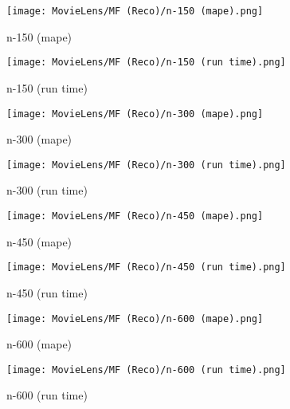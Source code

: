 \documentclass[12pt]{article}
\begin{document}
\begin{figure}[H]
\centering
    \begin{minipage}{0.45\textwidth}
        \centering
        \texttt{[image: MovieLens/MF (Reco)/n-150 (mape).png]}
        \caption{n-150 (mape)}
        
    \end{minipage}\hfill
    \begin{minipage}{0.45\textwidth}
        \centering
        \texttt{[image: MovieLens/MF (Reco)/n-150 (run time).png]}
        \caption{n-150 (run time)}
    \end{minipage}
\end{figure}

\begin{figure}[H]
\centering
    \begin{minipage}{0.45\textwidth}
        \centering
        \texttt{[image: MovieLens/MF (Reco)/n-300 (mape).png]}
        \caption{n-300 (mape)}
        
    \end{minipage}\hfill
    \begin{minipage}{0.45\textwidth}
        \centering
        \texttt{[image: MovieLens/MF (Reco)/n-300 (run time).png]}
        \caption{n-300 (run time)}
    \end{minipage}
\end{figure}

\begin{figure}[H]
\centering
    \begin{minipage}{0.45\textwidth}
        \centering
        \texttt{[image: MovieLens/MF (Reco)/n-450 (mape).png]}
        \caption{n-450 (mape)}
        
    \end{minipage}\hfill
    \begin{minipage}{0.45\textwidth}
        \centering
        \texttt{[image: MovieLens/MF (Reco)/n-450 (run time).png]}
        \caption{n-450 (run time)}
    \end{minipage}
\end{figure}

\begin{figure}[H]
\centering
    \begin{minipage}{0.45\textwidth}
        \centering
        \texttt{[image: MovieLens/MF (Reco)/n-600 (mape).png]}
        \caption{n-600 (mape)}
        
    \end{minipage}\hfill
    \begin{minipage}{0.45\textwidth}
        \centering
        \texttt{[image: MovieLens/MF (Reco)/n-600 (run time).png]}
        \caption{n-600 (run time)}
    \end{minipage}
\end{figure}
\end{document}
